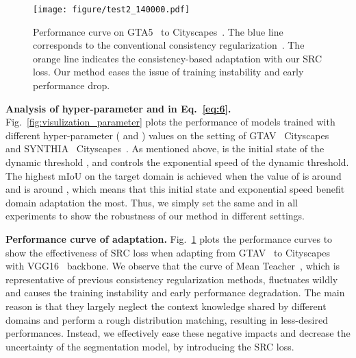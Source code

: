 \documentclass[journal]{IEEEtran}
\begin{document}
{\begin{minipage}{\textwidth}
\begin{figure}[t]
\centering
\texttt{[image: figure/test2\_140000.pdf]}
\vspace{-5mm}
\caption{Performance curve on GTA5~\cite{stephan2016gtav} to Cityscapes~\cite{cordts2016cityscapes}. The blue line corresponds to the conventional consistency regularization~\cite{choi2019self}. The orange line indicates the consistency-based adaptation with our SRC loss. Our method eases the issue of training instability and early performance drop. }
\label{fig:miou_performance_curve}
\vspace{-5mm}
\end{figure}

\noindent \textbf{Analysis of hyper-parameter  and  in Eq.~\ref{eq:6}.}
Fig.~\ref{fig:visulization_parameter} plots the performance of models trained with different hyper-parameter  ( and ) values on the setting of GTAV~\cite{stephan2016gtav}  Cityscapes~\cite{cordts2016cityscapes} and SYNTHIA~\cite{ros2016synthia}  Cityscapes~\cite{cordts2016cityscapes}. As mentioned above,  is the initial state of the dynamic threshold , and  controls the exponential speed of the dynamic threshold.
The highest mIoU on the target domain is
achieved when the value of    is around  and  is around , which means that this initial state and  exponential speed benefit domain adaptation the most. Thus, we simply set the same  and  in all experiments to show the robustness of our method in different settings.





\noindent \textbf{Performance curve of adaptation.}
Fig.~\ref{fig:miou_performance_curve} plots the performance curves to show the effectiveness of SRC loss when adapting from GTAV~\cite{stephan2016gtav} to Cityscapes \cite{cordts2016cityscapes} with VGG16~\cite{simonyan2015vgg} backbone. 
We observe that the curve of Mean Teacher~\cite{choi2019self}, which is representative of previous consistency regularization methods, fluctuates wildly and causes the training instability and early performance degradation. The main reason is that they largely neglect the context knowledge shared by different domains and perform a rough distribution matching, resulting in less-desired performances. Instead, we effectively ease these negative impacts and decrease the uncertainty of the segmentation model, by introducing the SRC loss.




\end{minipage}}
\end{document}

